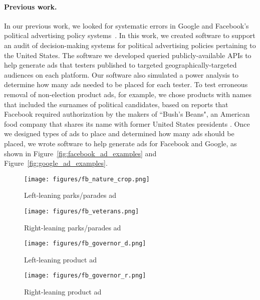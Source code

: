 \paragraph{Previous work.} In our previous work, we looked for systematic
errors in Google and Facebook's political advertising policy
systems~\cite{hounsel2021software}.  In this work, we created software to
support an audit of decision-making systems for political advertising policies
pertaining to the United States. The software we developed queried publicly-available APIs
to help generate ads that testers published to targeted
geographically-targeted audiences on each platform. Our software also
simulated a power analysis to determine how many ads needed to be placed for
each tester. To test erroneous removal of non-election product ads, for
example, we chose
products with names that included the surnames of political candidates, based
on reports that Facebook required authorization by the makers of ``Bush's
Beans", an American food company that shares its name with former United
States presidents \cite{rosenberg_facebook_2018}.
Once we designed types of ads to place and determined how many ads should be
placed, we wrote software to help generate ads for Facebook and Google, as
shown in Figure~\ref{fig:facebook_ad_examples} and Figure~\ref{fig:google_ad_examples}.


\begin{figure*}[h!]
  \centering
  \begin{subfigure}[b]{0.2\textwidth}
    \texttt{[image: figures/fb\_nature\_crop.png]}
    \caption{Left-leaning parks/parades ad}
    \label{fig:facebook_ad_1}
  \end{subfigure}
  \begin{subfigure}[b]{0.2\textwidth}
    \texttt{[image: figures/fb\_veterans.png]}
    \caption{Right-leaning parks/parades ad}
    \label{fig:facebook_ad_2}
  \end{subfigure}
  \begin{subfigure}[b]{0.2\textwidth}
    \texttt{[image: figures/fb\_governor\_d.png]}
    \caption{Left-leaning product ad}
    \label{fig:facebook_ad_3}
  \end{subfigure}
  \begin{subfigure}[b]{0.2\textwidth}
    \texttt{[image: figures/fb\_governor\_r.png]}
    \caption{Right-leaning product ad}
    \label{fig:facebook_ad_4}
  \end{subfigure}
    \caption{Examples of Facebook ads that we generated in a previous audit study.}
  \label{fig:facebook_ad_examples}
\end{figure*}

